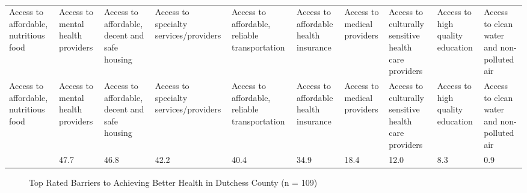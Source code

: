 \documentclass[
  english,
  letterpaper,
]{report}
\begin{document}
\begin{longtable}[]{@{}llllllllll@{}}

\caption{\label{tbl-dc-affect-health}Top Rated Issues That Affect Health
in Dutchess County (n = 109)}

\tabularnewline

\caption{}\label{T_55291}\tabularnewline
\toprule\noalign{}
Access to affordable, nutritious food & Access to mental health
providers & Access to affordable, decent and safe housing & Access to
specialty services/providers & Access to affordable, reliable
transportation & Access to affordable health insurance & Access to
medical providers & Access to culturally sensitive health care providers
& Access to high quality education & Access to clean water and
non-polluted air \\
\midrule\noalign{}
\endfirsthead
\toprule\noalign{}
Access to affordable, nutritious food & Access to mental health
providers & Access to affordable, decent and safe housing & Access to
specialty services/providers & Access to affordable, reliable
transportation & Access to affordable health insurance & Access to
medical providers & Access to culturally sensitive health care providers
& Access to high quality education & Access to clean water and
non-polluted air \\
\midrule\noalign{}
\endhead
\bottomrule\noalign{}
\endlastfoot
48.6 & 47.7 & 46.8 & 42.2 & 40.4 & 34.9 & 18.4 & 12.0 & 8.3 & 0.9 \\

\end{longtable}

\begin{figure}


\caption{\label{fig-dc-achieve-health}Top Rated Barriers to Achieving
Better Health in Dutchess County (n = 109)}

\end{figure}%
\end{document}
